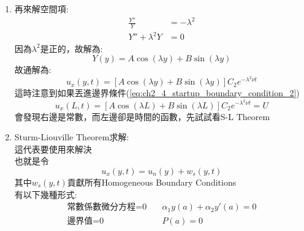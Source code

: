 \documentclass[../main.tex]{subfiles}
\begin{document}
\begin{itemize}
\begin{enumerate}
\begin{align}
        \int \frac{1}{T} dT &= \int \pm \lambda^2 \nu dt \nonumber\\
        \ln |T| &= \pm \lambda^2 \nu t + C_1 \nonumber\\
        T(t) &= C_2 e^{\pm \lambda^2 \nu t}
      \end{align}
      可以看出應該選擇$-\lambda^2$，因為這樣才不會隨時間發散\\
      故:
      \begin{equation}
        T(t) = C_2 e^{-\lambda^2 \nu t}
      \end{equation}
    \item 再來解空間項:
      \begin{align}
        \frac{Y''}{Y} &= -\lambda^2 \nonumber\\
        Y'' + \lambda^2 Y &= 0
      \end{align}
      因為$\lambda^2$是正的，故解為:
      \begin{equation}
        Y(y) = A \cos(\lambda y) + B \sin(\lambda y)
      \end{equation}
      故通解為:
      \begin{equation}
        u_x(y,t) = \left[
          A \cos(\lambda y) + B \sin(\lambda y)
        \right] C_2 e^{-\lambda^2 \nu t} \label{eq:ch2_4_startup_separation_of_variables_solution}
      \end{equation}
      這時注意到如果丟進邊界條件(\ref{eq:ch2_4_startup_boundary_condition_2})
      \begin{equation}
        u_x(L,t) = \left[
          A \cos(\lambda L) + B \sin(\lambda L)
        \right] C_2 e^{-\lambda^2 \nu t} = U
      \end{equation}
      會發現右邊是常數，而左邊卻是時間的函數，先試試看S-L Theorem
    \item Sturm-Liouville Theorem求解:\\
      這代表要使用來解決\\
      也就是令
      \begin{equation}
        u_x(y,t) = u_n(y) + w_s(y,t) \label{eq:ch2_4_startup_sl_theorem}
      \end{equation}
      其中$w_s(y,t)$貢獻所有Homogeneous Boundary Conditions\\
      有以下幾種形式:
      \begin{align}
        \text{常數係數微分方程=0}\quad & \alpha_1y(a) + \alpha_2y'(a) = 0 \nonumber\\
        \text{邊界值=0}\quad & P(a) = 0 \nonumber\\

\end{align}
\end{enumerate}
\end{itemize}
\end{document}
